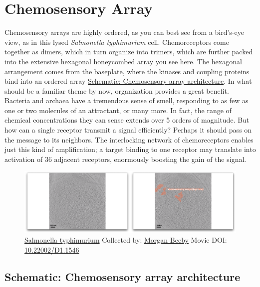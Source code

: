 \documentclass[]{tufte-book}
\begin{document}
\section{Chemosensory Array}\label{chemosensory-array}

Chemosensory arrays are highly ordered, as you can best see from a
bird's-eye view, as in this lysed \emph{Salmonella typhimurium} cell.
Chemoreceptors come together as dimers, which in turn organize into
trimers, which are further packed into the extensive hexagonal
honeycombed array you see here. The hexagonal arrangement comes from the
baseplate, where the kinases and coupling proteins bind into an ordered
array \protect\hyperlink{Chemosensory_array_architecture}{Schematic:
Chemosensory array architecture}. In what should be a familiar theme by
now, organization provides a great benefit. Bacteria and archaea have a
tremendous sense of smell, responding to as few as one or two molecules
of an attractant, or many more. In fact, the range of chemical
concentrations they can sense extends over 5 orders of magnitude. But
how can a single receptor transmit a signal efficiently? Perhaps it
should pass on the message to its neighbors. The interlocking network of
chemoreceptors enables just this kind of amplification; a target binding
to one receptor may translate into activation of 36 adjacent receptors,
enormously boosting the gain of the signal.





\begin{figure}
\includegraphics{movie_stills/7_2} \caption[\protect\hyperlink{tree}{Salmonella typhimurium} Collected by:
\protect\hyperlink{morgan_beeby}{Morgan Beeby} Movie DOI:
\href{https://doi.org/10.22002/D1.1546}{10.22002/D1.1546}]{\protect\hyperlink{tree}{Salmonella typhimurium} Collected by:
\protect\hyperlink{morgan_beeby}{Morgan Beeby} Movie DOI:
\href{https://doi.org/10.22002/D1.1546}{10.22002/D1.1546}}\label{fig:7-2}
\end{figure}

\hypertarget{Chemosensory_array_architecture}{\subsection*{Schematic:
Chemosensory array architecture}\label{Chemosensory_array_architecture}}
\end{document}
